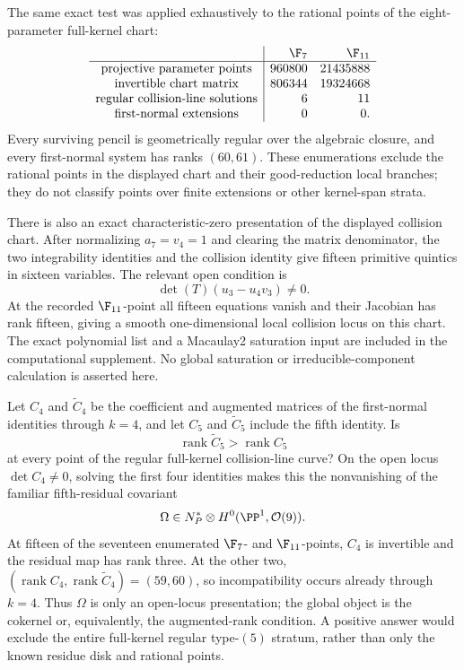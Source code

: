 The same exact test was applied exhaustively to the rational points of the
eight-parameter full-kernel chart:
\[
\begin{array}{c|rr}
&\F_7&\F_{11}\\ \hline
\text{projective parameter points}&960800&21435888\\
\text{invertible chart matrix}&806344&19324668\\
\text{regular collision-line solutions}&6&11\\
\text{first-normal extensions}&0&0.
\end{array}
\]
Every surviving pencil is geometrically regular over the algebraic closure,
and every first-normal system has ranks \((60,61)\).  These enumerations
exclude the rational points in the displayed chart and their
good-reduction local branches; they do not classify points over finite
extensions or other kernel-span strata.

There is also an exact characteristic-zero presentation of the displayed
collision chart.  After normalizing \(a_7=v_4=1\) and clearing the matrix
denominator, the two integrability identities and the collision identity
give fifteen primitive quintics in sixteen variables.  The relevant open
condition is
\[
 \det(T)(u_3-u_4v_3)\ne0.
\]
At the recorded \(\F_{11}\)-point all fifteen equations vanish and their
Jacobian has rank fifteen, giving a smooth one-dimensional local collision
locus on this chart.  The exact polynomial list and a Macaulay2 saturation
input are included in the computational supplement.  No global saturation
or irreducible-component calculation is asserted here.

\begin{question}
\label{q:n5-global-first-normal}
Let \(C_4\) and \(\widetilde C_4\) be the coefficient and augmented matrices
of the first-normal identities through \(k=4\), and let \(C_5\) and
\(\widetilde C_5\) include the fifth identity.  Is
\[
 \operatorname{rank}\widetilde C_5>
 \operatorname{rank}C_5
\]
at every point of the regular full-kernel collision-line curve?  On the open
locus \(\det C_4\ne0\), solving the first four identities makes this the
nonvanishing of the familiar fifth-residual covariant
\[
 \Omega\in N_P^*\otimes H^0(\PP^1,\mathcal O(9)).
\]
At fifteen of the seventeen enumerated \(\F_7\)- and \(\F_{11}\)-points,
\(C_4\) is invertible and the residual map has rank three.  At the other two,
\((\operatorname{rank}C_4,\operatorname{rank}\widetilde C_4)=(59,60)\), so
incompatibility occurs already through \(k=4\).  Thus \(\Omega\) is only an
open-locus presentation; the global object is the cokernel or, equivalently,
the augmented-rank condition.  A positive answer would exclude the entire
full-kernel regular type-\((5)\) stratum, rather than only the known residue
disk and rational points.
\end{question}

